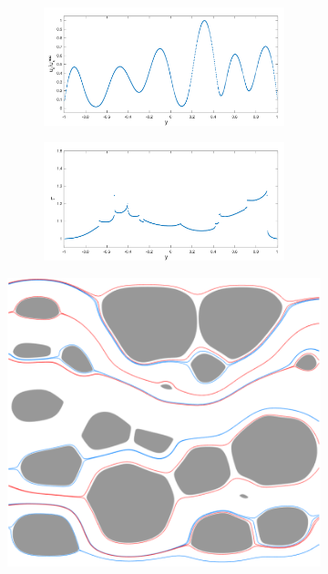 \documentclass[preprint, 10pt]{elsarticle}
\begin{document}
\begin{figure}[H]
\begin{subfigure}[b]{0.45\textwidth}
\begin{subfigure}[b]{\textwidth}
\includegraphics*[width =\linewidth]{./figs/velocity_loc20_268}
\caption{}
\end{subfigure}
\begin{subfigure}[b]{\textwidth}
\includegraphics*[width =\linewidth]{./figs/tort_local20_268}
\caption{}
\end{subfigure}
\end{subfigure}
\begin{subfigure}[b]{0.5\textwidth}
\includegraphics*[width =\linewidth]{./figs/tort_diff_top10_268}

\end{subfigure}
\end{figure}
\end{document}
